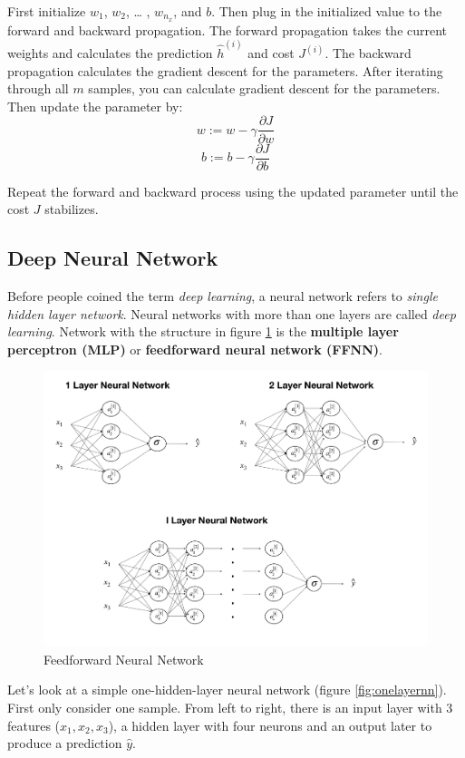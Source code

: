 \documentclass[12pt,]{krantz}
\begin{document}
First initialize \(w_1\), \(w_2\), \ldots{} , \(w_{n_x}\), and \(b\). Then plug in the initialized value to the forward and backward propagation. The forward propagation takes the current weights and calculates the prediction \(\hat{h}^{(i)}\) and cost \(J^{(i)}\). The backward propagation calculates the gradient descent for the parameters. After iterating through all \(m\) samples, you can calculate gradient descent for the parameters. Then update the parameter by:
\[w := w - \gamma \frac{\partial J}{\partial w}\]
\[b := b - \gamma \frac{\partial J}{\partial b}\]

Repeat the forward and backward process using the updated parameter until the cost \(J\) stabilizes.

\hypertarget{deepneuralnetwork}{%
\subsection{Deep Neural Network}\label{deepneuralnetwork}}

Before people coined the term \emph{deep learning}, a neural network refers to \emph{single hidden layer network}. Neural networks with more than one layers are called \emph{deep learning}. Network with the structure in figure \ref{fig:ffnn} is the \textbf{multiple layer perceptron (MLP)} or \textbf{feedforward neural network (FFNN)}.

\begin{figure}

{\centering \includegraphics[width=0.8\linewidth]{images/dnn_str} 

}

\caption{Feedforward Neural Network}\label{fig:ffnn}
\end{figure}

Let's look at a simple one-hidden-layer neural network (figure \ref{fig:onelayernn}). First only consider one sample. From left to right, there is an input layer with 3 features (\(x_1, x_2, x_3\)), a hidden layer with four neurons and an output later to produce a prediction \(\hat{y}\).
\end{document}
